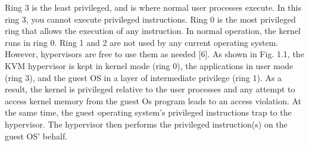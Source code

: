 \documentclass{report}
\begin{document}
\begin{spacing}{1.5}
{\begin{figure}[!h]
\begin{center}
\end{center}
\end{figure}
}

{\large
Ring 3 is the least privileged, and is where normal user processes execute. In this ring 3, you cannot execute privileged instructions. Ring 0 is the most privileged ring that allows the execution of any instruction. In normal operation, the kernel runs in ring 0. Ring 1 and 2 are not used by any current operating system. However, hypervisors are free to use them as needed [6]. As shown in Fig. 1.1, the KVM hypervisor is kept in kernel mode (ring 0), the applications in user mode (ring 3), and the guest OS in a layer of intermediate privilege (ring 1). As a result, the kernel is privileged relative to the user processes and any attempt to access kernel memory from the guest Os program leads to an access violation. At the same time, the guest operating system’s privileged instructions trap to the hypervisor. The hypervisor then performs the privileged instruction(s) on the guest OS' behalf.
\newline
}





\end{spacing}
\end{document}
